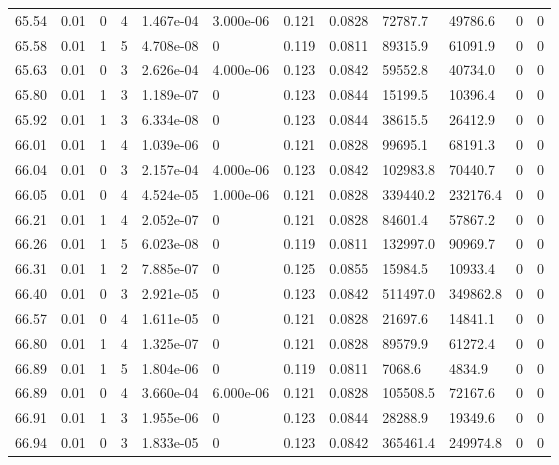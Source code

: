 \documentclass[preview]{standalone}
\begin{document}
{{{{{{{{{{{{{{{{{{{\begin{tabular}{L{1.2cm}C{1.2cm} C{0.3cm}C{0.5cm} C{1.4cm}C{1.4cm} C{1.4cm}C{1.4cm} C{1.6cm}C{1.6cm} C{1.6cm}C{1.6cm}}
  65.54  &  0.01  & 0     &  4 &  1.467e-04  & 3.000e-06  &  0.121&   0.0828& 72787.7 & 49786.6   &  0 & 0  \\ 
  65.58  &  0.01  & 1     &  5 &  4.708e-08  & 0  &  0.119&   0.0811& 89315.9 & 61091.9   &  0 & 0  \\ 
  65.63  &  0.01  & 0     &  3 &  2.626e-04  & 4.000e-06  &  0.123&   0.0842& 59552.8 & 40734.0   &  0 & 0  \\ 
  65.80  &  0.01  & 1     &  3 &  1.189e-07  & 0  &  0.123&   0.0844& 15199.5 & 10396.4   &  0 & 0  \\ 
  65.92  &  0.01  & 1     &  3 &  6.334e-08  & 0  &  0.123&   0.0844& 38615.5 & 26412.9   &  0 & 0  \\ 
  66.01  &  0.01  & 1     &  4 &  1.039e-06  & 0  &  0.121&   0.0828& 99695.1 & 68191.3   &  0 & 0  \\ 
  66.04  &  0.01  & 0     &  3 &  2.157e-04  & 4.000e-06  &  0.123&   0.0842& 102983.8 & 70440.7   &  0 & 0  \\ 
  66.05  &  0.01  & 0     &  4 &  4.524e-05  & 1.000e-06  &  0.121&   0.0828& 339440.2 & 232176.4   &  0 & 0  \\ 
  66.21  &  0.01  & 1     &  4 &  2.052e-07  & 0  &  0.121&   0.0828& 84601.4 & 57867.2   &  0 & 0  \\ 
  66.26  &  0.01  & 1     &  5 &  6.023e-08  & 0  &  0.119&   0.0811& 132997.0 & 90969.7   &  0 & 0  \\ 
  66.31  &  0.01  & 1     &  2 &  7.885e-07  & 0  &  0.125&   0.0855& 15984.5 & 10933.4   &  0 & 0  \\ 
  66.40  &  0.01  & 0     &  3 &  2.921e-05  & 0  &  0.123&   0.0842& 511497.0 & 349862.8   &  0 & 0  \\ 
  66.57  &  0.01  & 0     &  4 &  1.611e-05  & 0  &  0.121&   0.0828& 21697.6 & 14841.1   &  0 & 0  \\ 
  66.80  &  0.01  & 1     &  4 &  1.325e-07  & 0  &  0.121&   0.0828& 89579.9 & 61272.4   &  0 & 0  \\ 
  66.89  &  0.01  & 1     &  5 &  1.804e-06  & 0  &  0.119&   0.0811& 7068.6 & 4834.9   &  0 & 0  \\ 
  66.89  &  0.01  & 0     &  4 &  3.660e-04  & 6.000e-06  &  0.121&   0.0828& 105508.5 & 72167.6   &  0 & 0  \\ 
  66.91  &  0.01  & 1     &  3 &  1.955e-06  & 0  &  0.123&   0.0844& 28288.9 & 19349.6   &  0 & 0  \\ 
  66.94  &  0.01  & 0     &  3 &  1.833e-05  & 0  &  0.123&   0.0842& 365461.4 & 249974.8   &  0 & 0  \\ 

\end{tabular}}}}}}}}}}}}}}}}}}}}
\end{document}
